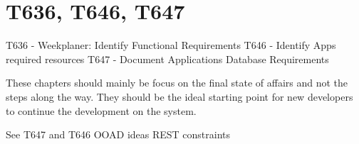 \chapter{T636, T646, T647}\label{S1CS}

T636 - Weekplaner: Identify Functional Requirements
T646 - Identify Apps required resources
T647 - Document Applications Database Requirements


These chapters should mainly be focus on the final state of affairs and not the
steps along the way. They should be the ideal starting point for new developers
to continue the development on the system.


See T647 and T646
OOAD ideas
REST constraints